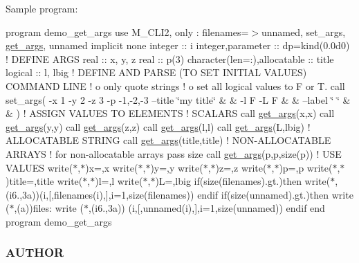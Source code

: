 Sample program\+:

program demo\+\_\+get\+\_\+args use M\+\_\+\+C\+L\+I2, only \+: filenames=$>$unnamed, set\+\_\+args, \mbox{\hyperlink{interfacem__cli2_1_1get__args}{get\+\_\+args}}, unnamed implicit none integer \+:\+: i integer,parameter \+:\+: dp=kind(0.\+0d0) ! D\+E\+F\+I\+NE A\+R\+GS real \+:\+: x, y, z real \+:\+: p(3) character(len=\+:),allocatable \+:\+: title logical \+:\+: l, lbig ! D\+E\+F\+I\+NE A\+ND P\+A\+R\+SE (TO S\+ET I\+N\+I\+T\+I\+AL V\+A\+L\+U\+ES) C\+O\+M\+M\+A\+ND L\+I\+NE ! o only quote strings ! o set all logical values to F or T. call set\+\_\+args(\textquotesingle{} -\/x 1 -\/y 2 -\/z 3 -\/p -\/1,-\/2,-\/3 --title \char`\"{}my title\char`\"{} \& \& -\/l F -\/L F \& \& --label \char`\"{} \char`\"{} \& \& \textquotesingle{}) ! A\+S\+S\+I\+GN V\+A\+L\+U\+ES TO E\+L\+E\+M\+E\+N\+TS ! S\+C\+A\+L\+A\+RS call \mbox{\hyperlink{interfacem__cli2_1_1get__args}{get\+\_\+args}}(\textquotesingle{}x\textquotesingle{},x) call \mbox{\hyperlink{interfacem__cli2_1_1get__args}{get\+\_\+args}}(\textquotesingle{}y\textquotesingle{},y) call \mbox{\hyperlink{interfacem__cli2_1_1get__args}{get\+\_\+args}}(\textquotesingle{}z\textquotesingle{},z) call \mbox{\hyperlink{interfacem__cli2_1_1get__args}{get\+\_\+args}}(\textquotesingle{}l\textquotesingle{},l) call \mbox{\hyperlink{interfacem__cli2_1_1get__args}{get\+\_\+args}}(\textquotesingle{}L\textquotesingle{},lbig) ! A\+L\+L\+O\+C\+A\+T\+A\+B\+LE S\+T\+R\+I\+NG call \mbox{\hyperlink{interfacem__cli2_1_1get__args}{get\+\_\+args}}(\textquotesingle{}title\textquotesingle{},title) ! N\+O\+N-\/\+A\+L\+L\+O\+C\+A\+T\+A\+B\+LE A\+R\+R\+A\+YS ! for non-\/allocatable arrays pass size call \mbox{\hyperlink{interfacem__cli2_1_1get__args}{get\+\_\+args}}(\textquotesingle{}p\textquotesingle{},p,size(p)) ! U\+SE V\+A\+L\+U\+ES write($\ast$,$\ast$)\textquotesingle{}x=\textquotesingle{},x write($\ast$,$\ast$)\textquotesingle{}y=\textquotesingle{},y write($\ast$,$\ast$)\textquotesingle{}z=\textquotesingle{},z write($\ast$,$\ast$)\textquotesingle{}p=\textquotesingle{},p write($\ast$,$\ast$)\textquotesingle{}title=\textquotesingle{},title write($\ast$,$\ast$)\textquotesingle{}l=\textquotesingle{},l write($\ast$,$\ast$)\textquotesingle{}L=\textquotesingle{},lbig if(size(filenames).gt.)then write($\ast$,\textquotesingle{}(i6.,3a)\textquotesingle{})(i,\textquotesingle{}\mbox{[}\textquotesingle{},filenames(i),\textquotesingle{}\mbox{]}\textquotesingle{},i=1,size(filenames)) endif if(size(unnamed).gt.)then write ($\ast$,\textquotesingle{}(a)\textquotesingle{})\textquotesingle{}files\+:\textquotesingle{} write ($\ast$,\textquotesingle{}(i6.,3a)\textquotesingle{}) (i,\textquotesingle{}\mbox{[}\textquotesingle{},unnamed(i),\textquotesingle{}\mbox{]}\textquotesingle{},i=1,size(unnamed)) endif end program demo\+\_\+get\+\_\+args \subsubsection*{A\+U\+T\+H\+OR}

